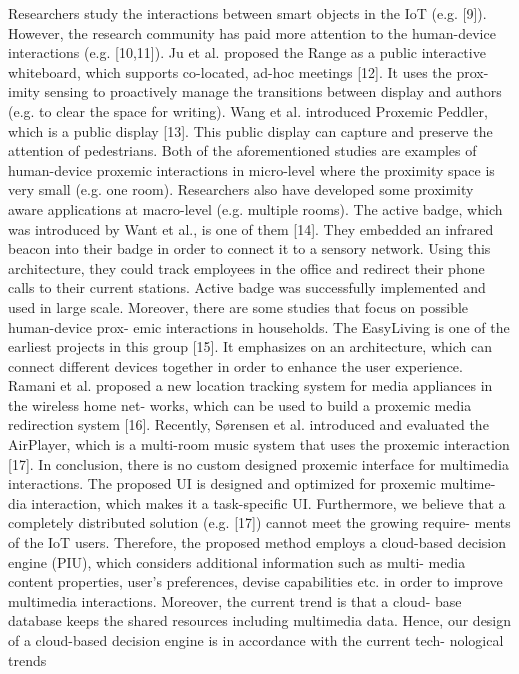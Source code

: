 \documentclass[runningheads,a4paper]{llncs}
\begin{document}
Researchers study the interactions between smart objects in the IoT (e.g. [9]). However, the research community has paid more attention to the human-device interactions (e.g. [10,11]). Ju et al. proposed the Range as a public interactive whiteboard, which supports co-located, ad-hoc meetings [12]. It uses the prox- imity sensing to proactively manage the transitions between display and authors (e.g. to clear the space for writing). Wang et al. introduced Proxemic Peddler, which is a public display [13]. This public display can capture and preserve the attention of pedestrians. Both of the aforementioned studies are examples of human-device proxemic interactions in micro-level where the proximity space is very small (e.g. one room). Researchers also have developed some proximity aware applications at macro-level (e.g. multiple rooms). The active badge, which was introduced by Want et al., is one of them [14]. They embedded an infrared beacon into their badge in order to connect it to a sensory network. Using this architecture, they could track employees in the office and redirect their phone calls to their current stations. Active badge was successfully implemented and used in large scale. 
\newline
Moreover, there are some studies that focus on possible human-device prox- emic interactions in households. The EasyLiving is one of the earliest projects in this group [15]. It emphasizes on an architecture, which can connect different devices together in order to enhance the user experience. Ramani et al. proposed a new location tracking system for media appliances in the wireless home net- works, which can be used to build a proxemic media redirection system [16]. Recently, Sørensen et al. introduced and evaluated the AirPlayer, which is a multi-room music system that uses the proxemic interaction [17]. \newline
In conclusion, there is no custom designed proxemic interface for multimedia interactions. The proposed UI is designed and optimized for proxemic multime- dia interaction, which makes it a task-specific UI. Furthermore, we believe that a completely distributed solution (e.g. [17]) cannot meet the growing require- ments of the IoT users. Therefore, the proposed method employs a cloud-based decision engine (PIU), which considers additional information such as multi- media content properties, user’s preferences, devise capabilities etc. in order to improve multimedia interactions. Moreover, the current trend is that a cloud- base database keeps the shared resources including multimedia data. Hence, our design of a cloud-based decision engine is in accordance with the current tech- nological trends
\end{document}

